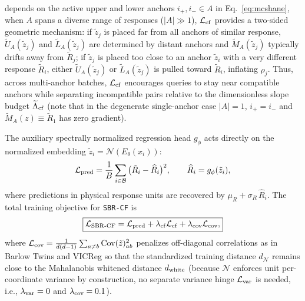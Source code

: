 \documentclass[preprint,11pt,a4paper]{elsarticle}
\newcommand{\Cov}{\operatorname{Cov}}
\begin{document}
depends on the active upper and lower anchors $i_+,i_-\in A$ in Eq.~\eqref{eq:mcshane}, when $A$ spans a diverse range of responses ($|A|\gg 1$), $\mathcal L_{\rm cf}$ provides a two-sided geometric mechanism: if $\tilde z_j$ is placed far from all anchors of similar response, $\widetilde U_A(\tilde z_j)$ and $\widetilde L_A(\tilde z_j)$ are determined by distant anchors and $\widetilde M_A(\tilde z_j)$ typically drifts away from $\tilde R_j$; if $\tilde z_j$ is placed too close to an anchor $\tilde z_i$ with a very different response $\tilde R_i$, either $\widetilde U_A(\tilde z_j)$ or $\widetilde L_A(\tilde z_j)$ is pulled toward $\tilde R_i$, inflating $\rho_j$. Thus, across multi-anchor batches, $\mathcal L_{\rm cf}$ encourages queries to stay near compatible anchors while separating incompatible pairs relative to the dimensionless slope budget $\widetilde\Lambda_{\rm cf}$ (note that in the degenerate single-anchor case $|A|=1$, $i_+=i_-$ and $\widetilde M_A(z)\equiv \tilde R_1$ has zero gradient).

The auxiliary spectrally normalized regression head $g_\phi$ acts directly on the normalized embedding $\tilde z_i = \mathcal N(E_\theta(x_i))$:
\begin{equation}
\mathcal L_{\rm pred}
=
\frac1B\sum_{i\in\mathcal B}\big(\tilde R_i-\widehat R_i\big)^2,
\qquad
\widehat R_i = g_\phi(\tilde z_i),
\end{equation}
where predictions in physical response units are recovered by $\mu_R + \sigma_R\,\widehat R_i$. The total training objective for \texttt{SBR-CF} is
\begin{equation}
\boxed{
\mathcal L_{\rm SBR\text{-}CF}
=
\mathcal L_{\rm pred}
+
\lambda_{\rm cf}\mathcal L_{\rm cf}
+
\lambda_{\rm cov}\mathcal L_{\rm cov},
}
\label{eq:total-loss}
\end{equation}
where $\mathcal L_{\rm cov}=\frac{1}{d(d-1)}\sum_{a\ne b}\Cov(\tilde z)_{ab}^2$ penalizes off-diagonal correlations as in Barlow Twins \cite{Barlow2021} and VICReg \cite{VICReg2022} so that the standardized training distance $d_{\mathcal N}$ remains close to the Mahalanobis whitened distance $d_{\rm white}$ (because $\mathcal N$ enforces unit per-coordinate variance by construction, no separate variance hinge $\mathcal L_{\rm var}$ is needed, i.e., $\lambda_{\rm var}=0$ and $\lambda_{\rm cov}=0.1$).
\end{document}
